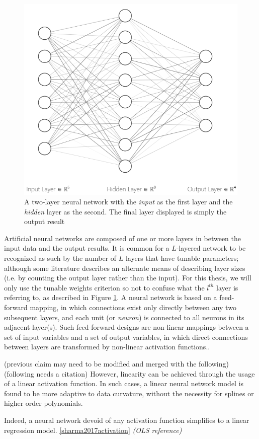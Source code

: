 

\begin{figure}
  \vspace{-50pt}
    \centering
    \includegraphics[width=.4\textwidth]{Figures/NN_int.png}
    \caption{\footnotesize{A two-layer neural network with the \emph{input} as the first layer and the \emph{hidden} layer as the second.  The final layer displayed is simply the output result}}
  \label{NNet}
  \vspace{-20pt}
\end{figure}

Artificial neural networks are composed of one or more layers in between the input data and the output results.  It is common for a $L$-layered network to be recognized as such by the number of $L$ layers that have tunable parameters; although some literature describes an alternate means of describing layer sizes \cite{bishop1995} (i.e. by counting the output layer rather than the input).  For this thesis, we will only use the tunable weights criterion so not to confuse what the $l^{th}$ layer is referring to, as described in Figure \ref{NNet}.  A neural network is based on a feed-forward mapping, in which connections exist only directly between any two subsequent layers, and each unit (or \textit{neuron}) is connected to all neurons in its adjacent layer(s).  Such feed-forward designs are non-linear mappings between a set of input variables and a set of output variables, in which direct connections between layers are transformed by non-linear activation functions.\cite{bishop2006pattern}.

(previous claim may need to be modified and merged with the following)
(following needs a citation)
However, linearity can be achieved through the usage of a linear activation function.  In such cases, a linear neural network model is found to be more adaptive to data curvature, without the necessity for splines or higher order polynomials.

Indeed, a neural network devoid of any activation function simplifies to a linear regression model. \ref{sharma2017activation} \textit{(OLS reference)}


